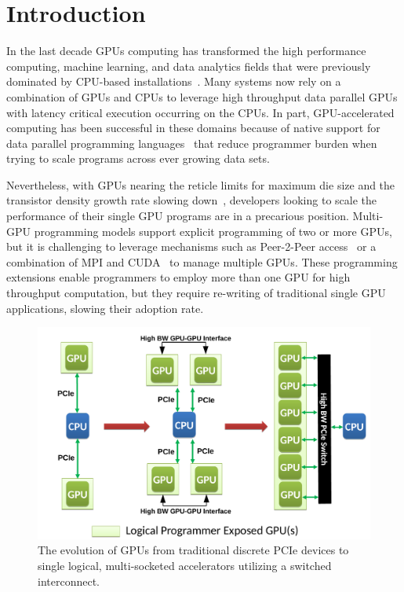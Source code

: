 \section{Introduction}
\label{introduction}

In the last decade GPUs computing has transformed the high performance 
computing, machine learning, and data analytics fields that were previously 
dominated by CPU-based 
installations~\cite{intersect360,cudnn,Lavin15b,SimonyanZ14a}. Many systems now 
rely on a combination of GPUs and CPUs to leverage high throughput data parallel 
GPUs with latency critical execution occurring on the CPUs. In part, 
GPU-accelerated computing has been successful in these domains because of native 
support for data parallel programming languages~\cite{CUDA7,OPENCL} that reduce 
programmer burden when trying to scale programs across ever growing data sets.

Nevertheless, with GPUs nearing the reticle limits for maximum die size and 
the transistor density growth rate slowing down~\cite{mooredead2016}, developers 
looking to scale the performance of their single GPU programs are in a 
precarious position. Multi-GPU programming models support explicit programming 
of two or more GPUs, but it is challenging to leverage mechanisms such as 
Peer-2-Peer access~\cite{NVIDIAP2P} or a combination of MPI and 
CUDA~\cite{NVIDIAMPI} to manage multiple GPUs. These programming extensions 
enable programmers to employ more than one GPU for high throughput computation, 
but they require re-writing of traditional single GPU applications,
slowing their adoption rate.

\begin{figure}[t]
	\centering
	\includegraphics[width=1.0\columnwidth]{figures/inter_gpu_connections.pdf}
	\caption{The evolution of GPUs from traditional discrete PCIe devices to 
		single logical, multi-socketed accelerators utilizing a switched interconnect.}
	\label{fig:systemdiagram}
\end{figure}

